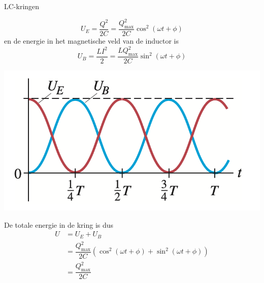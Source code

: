 \begin{app}[LC-kringen]{LC-kringen}
    \begin{minipage}{.70\textwidth}
        \begin{equation*}
            U_{E} = \dfrac{Q^{2}}{2C} = \dfrac{Q_{\max}^2}{2C}\cos^2(\omega t + \phi)
        \end{equation*}
        \hspace{-0.6cm} en de energie in het magnetische veld van de inductor is 
        \begin{equation*}
            U_{B} = \dfrac{LI^{2}}{2} = \dfrac{LQ_{\max}^2}{2C}\sin^2(\omega t + \phi)
        \end{equation*}
    \end{minipage}
    \begin{minipage}{.26\textwidth}
        \vspace{0cm}\hspace{-1.4cm}\includegraphics[scale = 0.4]{Images/Magnetisme/LCKringOscillatie.png} 
    \end{minipage}
    De totale energie in de kring is dus
    \begin{align*}
        U &= U_{E} + U_{B} \\
          &= \dfrac{Q_{\max}^2}{2C}\left(\cos^2(\omega t + \phi) +\sin^2(\omega t + \phi)\right) \\ 
          &= \dfrac{Q_{\max}^2}{2C}
    \end{align*}
    \vspace{-0.3cm}
\end{app}

\newpage

